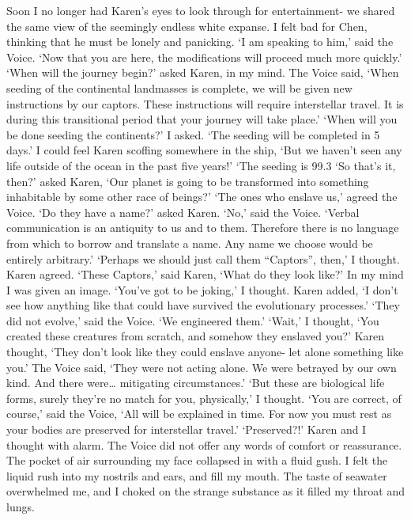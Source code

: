 \documentclass[a4paper]{article}
\begin{document}
Soon I no longer had Karen’s eyes to look through for entertainment- we shared the same view of the seemingly endless white expanse. I felt bad for Chen, thinking that he must be lonely and panicking.
‘I am speaking to him,’ said the Voice. ‘Now that you are here, the modifications will proceed much more quickly.’
‘When will the journey begin?’ asked Karen, in my mind.
The Voice said, ‘When seeding of the continental landmasses is complete, we will be given new instructions by our captors. These instructions will require interstellar travel. It is during this transitional period that your journey will take place.’
‘When will you be done seeding the continents?’ I asked.
‘The seeding will be completed in 5 days.’
I could feel Karen scoffing somewhere in the ship, ‘But we haven’t seen any life outside of the ocean in the past five years!’
‘The seeding is 99.3%
‘So that’s it, then?’ asked Karen, ‘Our planet is going to be transformed into something inhabitable by some other race of beings?’
‘The ones who enslave us,’ agreed the Voice.
‘Do they have a name?’ asked Karen.
‘No,’ said the Voice. ‘Verbal communication is an antiquity to us and to them. Therefore there is no language from which to borrow and translate a name. Any name we choose would be entirely arbitrary.’
‘Perhaps we should just call them “Captors”, then,’ I thought. Karen agreed.
‘These Captors,’ said Karen, ‘What do they look like?’
In my mind I was given an image. ‘You’ve got to be joking,’ I thought.
Karen added, ‘I don’t see how anything like that could have survived the evolutionary processes.’
‘They did not evolve,’ said the Voice. ‘We engineered them.’
‘Wait,’ I thought, ‘You created these creatures from scratch, and somehow they enslaved you?’
Karen thought, ‘They don’t look like they could enslave anyone- let alone something like you.’
The Voice said, ‘They were not acting alone. We were betrayed by our own kind. And there were… mitigating circumstances.’
‘But these are biological life forms, surely they’re no match for you, physically,’ I thought.
‘You are correct, of course,’ said the Voice, ‘All will be explained in time. For now you must rest as your bodies are preserved for interstellar travel.’
‘Preserved?!’ Karen and I thought with alarm.
The Voice did not offer any words of comfort or reassurance.
The pocket of air surrounding my face collapsed in with a fluid gush. I felt the liquid rush into my nostrils and ears, and fill my mouth. The taste of seawater overwhelmed me, and I choked on the strange substance as it filled my throat and lungs.
\end{document}
